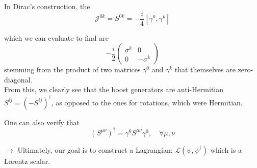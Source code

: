 \documentclass[11pt]{article}
\newcommand{\lag}{\mathcal{L}}
\begin{document}
	 	 In Dirac's construction, the $$\mathcal{J}^{0k} = S^{0k}  = -\frac{i}{4}[\gamma^0, \gamma^k]$$
	 	 
	 	 which we can evaluate to find are $$ -\frac{i}{2}\begin{pmatrix}
	 	 	\sigma^k & 0 \\ 0 & -\sigma^k
	 	 \end{pmatrix}$$
	 	stemming from the product of two matrices $\gamma^0$ and $\gamma^k$ that themselves are zero-diagonal.\\
	 	
	 	From this, we clearly see that the boost generators are anti-Hermitian $S^{ij} = (-S^{ij})^\dagger$, as opposed to the ones for rotations, which were Hermitian.
	 	
	 	One can also verify that $$ (S^{\mu\nu})^\dagger = \gamma^0 S^{\mu\nu} \gamma^0, \quad \forall \mu, \nu$$
	 	
	 	{\color{red}$\rightarrow$} Ultimately, our goal is to construct a Lagrangian: $ \lag (\psi, \psi^\dagger)$ which is a Lorentz scalar.
\end{document}
